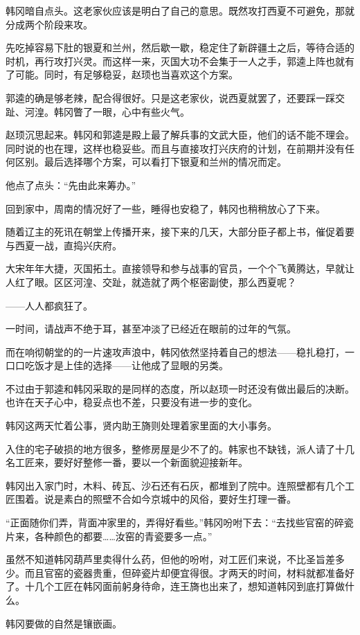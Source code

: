 韩冈暗自点头。这老家伙应该是明白了自己的意思。既然攻打西夏不可避免，那就分成两个阶段来攻。

先吃掉容易下肚的银夏和兰州，然后歇一歇，稳定住了新辟疆土之后，等待合适的时机，再行攻打兴灵。而这样一来，灭国大功不会集于一人之手，郭逵上阵也就有了可能。同时，有足够稳妥，赵顼也当喜欢这个方案。

郭逵的确是够老辣，配合得很好。只是这老家伙，说西夏就罢了，还要踩一踩交趾、河湟。韩冈瞥了一眼，心中有些火气。

赵顼沉思起来。韩冈和郭逵是殿上最了解兵事的文武大臣，他们的话不能不理会。同时说的也在理，这样也稳妥些。而且与直接攻打兴庆府的计划，在前期并没有任何区别。最后选择哪个方案，可以看打下银夏和兰州的情况而定。

他点了点头：“先由此来筹办。”

回到家中，周南的情况好了一些，睡得也安稳了，韩冈也稍稍放心了下来。

随着辽主的死讯在朝堂上传播开来，接下来的几天，大部分臣子都上书，催促着要与西夏一战，直捣兴庆府。

大宋年年大捷，灭国拓土。直接领导和参与战事的官员，一个个飞黄腾达，早就让人红了眼。区区河湟、交趾，就造就了两个枢密副使，那么西夏呢？

——人人都疯狂了。

一时间，请战声不绝于耳，甚至冲淡了已经近在眼前的过年的气氛。

而在响彻朝堂的的一片速攻声浪中，韩冈依然坚持着自己的想法——稳扎稳打，一口口吃饭才是上佳的选择——让他成了显眼的另类。

不过由于郭逵和韩冈采取的是同样的态度，所以赵顼一时还没有做出最后的决断。也许在天子心中，稳妥点也不差，只要没有进一步的变化。

韩冈这两天忙着公事，贤内助王旖则处理着家里面的大小事务。

入住的宅子破损的地方很多，整修房屋是少不了的。韩家也不缺钱，派人请了十几名工匠来，要好好整修一番，要以一个新面貌迎接新年。

韩冈出入家门时，木料、砖瓦、沙石还有石灰，都堆到了院中。连照壁都有几个工匠围着。说是素白的照壁不合如今京城中的风俗，要好生打理一番。

“正面随你们弄，背面冲家里的，弄得好看些。”韩冈吩咐下去：“去找些官窑的碎瓷片来，各种颜色的都要……汝窑的青瓷要多一点。”

虽然不知道韩冈葫芦里卖得什么药，但他的吩咐，对工匠们来说，不比圣旨差多少。而且官窑的瓷器贵重，但碎瓷片却便宜得很。才两天的时间，材料就都准备好了。十几个工匠在韩冈面前躬身待命，连王旖也出来了，想知道韩冈到底打算做什么。

韩冈要做的自然是镶嵌画。

